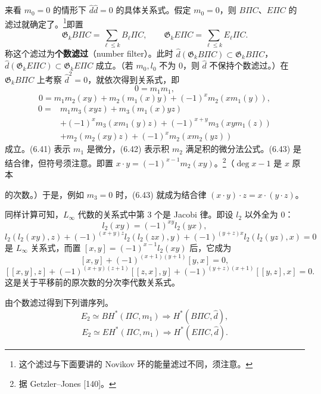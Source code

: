 来看 $m_0=0$ 的情形下 $\hat d\hat d=0$ 的具体关系式。假定 $m_0=0$，则 $B\Pi C$、$E\Pi C$ 的滤过就确定了。\footnote{这个滤过与下面要讲的 Novikov 环的能量滤过不同，须注意。}即置
\begin{equation}
  \mathfrak{G}_kB\Pi C=\sum_{\ell\le k}B_\ell\Pi C,\qquad
  \mathfrak{G}_kE\Pi C=\sum_{\ell\le k}E_\ell\Pi C. \tag{6.40}
\end{equation}
称这个滤过为\textbf{个数滤过}（number filter）。此时 $\hat d(\mathfrak{G}_kB\Pi C)\subset\mathfrak{G}_kB\Pi C$，$\hat d(\mathfrak{G}_kE\Pi C)\subset\mathfrak{G}_kE\Pi C$ 成立。（若 $m_0,l_0$ 不为 0，则 $\hat d$ 不保持个数滤过。）在 $\mathfrak{G}_kB\Pi C$ 上考察 $\hat d^2=0$，就依次得到关系式，即
\begin{equation}
  0=m_1m_1, \tag{6.41}
\end{equation}
\begin{equation}
  0=m_1m_2(xy)+m_2(m_1(x)y)+(-1)^xm_2(xm_1(y)), \tag{6.42}
\end{equation}
\begin{equation}
  \begin{aligned}
    0={}&m_1m_3(xyz)+m_3(m_1(x)yz)\\
    &+(-1)^xm_3(xm_1(y)z)+(-1)^{x+y}m_3(xym_1(z))\\
    &+m_2(m_2(xy)z)+(-1)^xm_2(xm_2(yz))
  \end{aligned} \tag{6.43}
\end{equation}
成立。(6.41) 表示 $m_1$ 是微分，(6.42) 表示积 $m_2$ 满足积的微分法公式。(6.43) 是结合律，但符号须注意。即置 $x\cdot y=(-1)^{x-1}m_2(xy)$。\footnote{据 Getzler–Jones [140]。}（$\deg x-1$ 是 $x$ 原本

的次数。）于是，例如 $m_3=0$ 时，(6.43) 就成为结合律 $(x\cdot y)\cdot z=x\cdot(y\cdot z)$。

同样计算可知，$L_{\infty}$ 代数的关系式中第 3 个是 Jacobi 律。即设 $l_2$ 以外全为 0：
\[
  l_2(xy)=(-1)^{xy}l_2(yx),
\]
\[
  l_2(l_2(xy),z)+(-1)^{(x+y)z}l_2(l_2(zx),y)+(-1)^{(y+z)x}l_2(l_2(yz),x)=0
\]
是 $L_{\infty}$ 关系式，而置 $[x,y]=(-1)^{x-1}l_2(xy)$ 后，它成为
\[
  [x,y]+(-1)^{(x+1)(y+1)}[y,x]=0,
\]
\[
  [[x,y],z]+(-1)^{(x+y)(z+1)}[[z,x],y]+(-1)^{(y+z)(x+1)}[[y,z],x]=0.
\]
这是关于平移前的原次数的分次李代数关系式。

由个数滤过得到下列谱序列。
\begin{equation}
  E_2\simeq BH^*(\Pi C,m_1)\Longrightarrow H^*(B\Pi C,\hat d), \tag{6.44}
\end{equation}
\begin{equation}
  E_2\simeq EH^*(\Pi C,m_1)\Longrightarrow H^*(E\Pi C,\hat d). \tag{6.45}
\end{equation}

